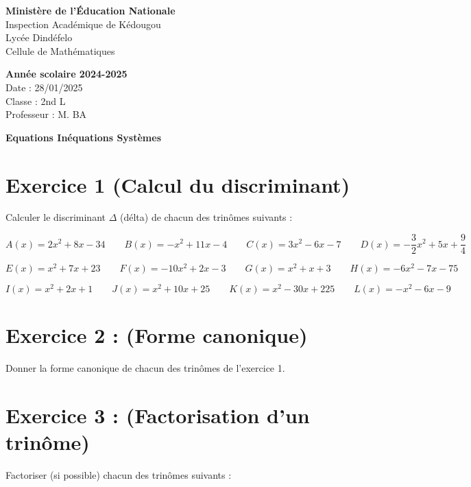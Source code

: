 \documentclass[12pt]{article}
\newcounter{exercice}
\begin{document}
\noindent
\begin{minipage}[t]{0.48\textwidth}
\raggedright
\textbf{Ministère de l'Éducation Nationale}\\
Inspection Académique de Kédougou\\
Lycée Dindéfelo\\
Cellule de Mathématiques
\end{minipage}
\hfill
\begin{minipage}[t]{0.48\textwidth}
\raggedleft
\textbf{Année scolaire 2024-2025}\\
Date : 28/01/2025\\
Classe : 2nd L\\
Professeur : M. BA
\end{minipage}

\vspace{0.5cm}

\begin{center}
\textbf{Equations Inéquations Systèmes}
\end{center}

\section*{Exercice 1 (Calcul du discriminant)}

Calculer le discriminant \(\Delta\) (délta) de chacun des trinômes suivants :

\[ A(x) = 2x^2 + 8x - 34 \quad\quad B(x) = -x^2 + 11x - 4  \quad\quad C(x) = 3x^2 - 6x - 7 \quad\quad D(x) = -\frac{3}{2}x^2 + 5x + \frac{9}{4} \] 

\[ E(x) = x^2 + 7x + 23 \quad\quad F(x) = -10x^2 + 2x - 3 \quad\quad G(x) = x^2 + x + 3  \quad\quad H(x) = -6x^2 - 7x - 75 \] 
   
\[I(x) = x^2 + 2x + 1 \quad\quad J(x) = x^2 + 10x + 25 \quad\quad  K(x) = x^2 - 30x + 225 \quad\quad L(x) = -x^2 - 6x - 9 \]      

\section*{Exercice 2 : (Forme canonique)}

Donner la forme canonique de chacun des trinômes de l’exercice 1.

\section*{Exercice 3 : (Factorisation d’un trinôme)}

Factoriser (si possible) chacun des trinômes suivants :
\end{document}
